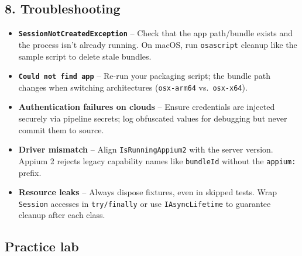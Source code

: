 \subsection{8. Troubleshooting}\label{troubleshooting-7}

\begin{itemize}
\tightlist
\item
  \textbf{\passthrough{\lstinline!SessionNotCreatedException!}} -- Check
  that the app path/bundle exists and the process isn't already running.
  On macOS, run \passthrough{\lstinline!osascript!} cleanup like the
  sample script to delete stale bundles.
\item
  \textbf{\passthrough{\lstinline!Could not find app!}} -- Re-run your
  packaging script; the bundle path changes when switching architectures
  (\passthrough{\lstinline!osx-arm64!}
  vs.~\passthrough{\lstinline!osx-x64!}).
\item
  \textbf{Authentication failures on clouds} -- Ensure credentials are
  injected securely via pipeline secrets; log obfuscated values for
  debugging but never commit them to source.
\item
  \textbf{Driver mismatch} -- Align
  \passthrough{\lstinline!IsRunningAppium2!} with the server version.
  Appium 2 rejects legacy capability names like
  \passthrough{\lstinline!bundleId!} without the
  \passthrough{\lstinline!appium:!} prefix.
\item
  \textbf{Resource leaks} -- Always dispose fixtures, even in skipped
  tests. Wrap \passthrough{\lstinline!Session!} accesses in
  \passthrough{\lstinline!try/finally!} or use
  \passthrough{\lstinline!IAsyncLifetime!} to guarantee cleanup after
  each class.
\end{itemize}

\subsection{Practice lab}\label{practice-lab-11}

